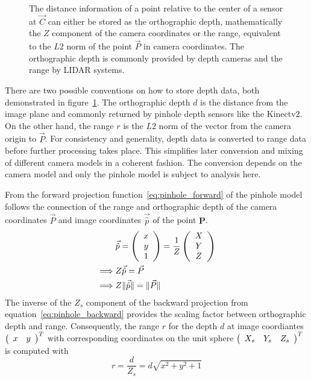 \begin{figure}[H]
    
    \caption[Orthographic Depth and Range visualized]{The distance information of a point relative to the center of a sensor at $\vec{C}$ can either be stored as the orthographic depth, mathematically the $Z$ component of the camera coordinates or the range, equivalent to the $L2$ norm of the point $\vec{P}$ in camera coordinates. The orthographic depth is commonly provided by depth cameras and the range by \acrshort{LIDAR} systems.}
    \label{fig:range_depth}
\end{figure}

There are two possible conventions on how to store depth data, both demonstrated in figure~\ref{fig:range_depth}.
The orthographic depth $d$ is the distance from the image plane and commonly returned by pinhole depth sensors like the Kinectv2.
On the other hand, the range $r$ is the $L2$ norm of the vector from the camera origin to $\vec{P}$.
For consistency and generality, depth data is converted to range data before further processing takes place.
This simplifies later conversion and mixing of different camera models in a coherent fashion.
The conversion depends on the camera model and only the pinhole model is subject to analysis here.

From the forward projection function~\ref{eq:pinhole_forward} of the pinhole model follows the connection of the range and orthographic depth of the camera coordinates $\vec{P}$ and image coordinates $\vec{\hat{p}}$ of the point $\mathbf{P}$.
\begin{equation}
\begin{aligned}
    &\vec{\hat{p}} = \left(\begin{array}{c} x \\ y \\ 1 \end{array}\right) = \frac{1}{Z}\left(\begin{array}{c} X \\ Y \\ Z \end{array}\right) \\
    \implies &Z \vec{\hat{p}} = \vec{P} \\
    \implies &Z \lVert\vec{\hat{p}}\rVert = \lVert\vec{P}\rVert
\end{aligned}
\end{equation}
The inverse of the $Z_{s}$ component of the backward projection from equation~\ref{eq:pinhole_backward} provides the scaling factor between orthographic depth and range.
Consequently, the range $r$ for the depth $d$ at image coordiantes $\left(\begin{array}{cc} x & y \end{array}\right)^T$ with corresponding coordinates on the unit sphere $\left(\begin{array}{ccc} X_s & Y_s & Z_s \end{array}\right)^T$ is computed with
\begin{equation}
    r = \frac{d}{Z_s} = d \sqrt{x^2 + y^2 + 1}
\end{equation}
